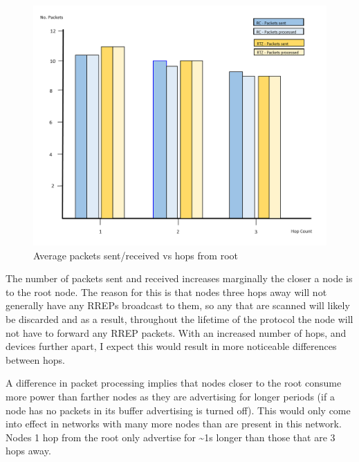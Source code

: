    \FloatBarrier
    \begin{figure}[ht]
      \includegraphics[width=\textwidth]{Images/chapter5/pkts_hop.png}
      \caption{Average packets sent/received vs hops from root}
      \label{fig:pkts_hop}
    \end{figure}
    \FloatBarrier

    The number of packets sent and received increases marginally the closer a node is to
    the root node. The reason for this is that nodes three hops away will not generally
    have any RREPs broadcast to them, so any that are scanned will likely be discarded and
    as a result, throughout the lifetime of the protocol the node will not have to forward any
    RREP packets. With an increased number of hops, and devices further apart, I
    expect this would result in more noticeable differences between hops.

    A difference in packet processing implies that nodes closer to the root consume more power than farther
    nodes as they are advertising for longer periods (if a node has no packets
    in its buffer advertising is turned off). This would only come into effect
    in networks with many more nodes than are present in this network. Nodes 1 hop from the root
    only advertise for \textasciitilde1s longer than those that are 3 hops away.

